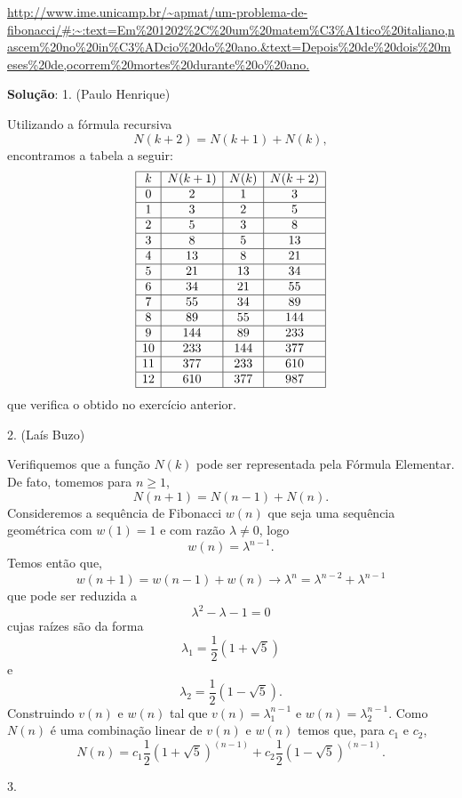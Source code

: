 \url{http://www.ime.unicamp.br/~apmat/um-problema-de-fibonacci/#:~:text=Em%201202%2C%20um%20matem%C3%A1tico%20italiano,nascem%20no%20in%C3%ADcio%20do%20ano.&text=Depois%20de%20dois%20meses%20de,ocorrem%20mortes%20durante%20o%20ano.}

{\color{red}
\textbf{Solução}: 
1. (Paulo Henrique)

Utilizando a fórmula recursiva
\[N(k+2) = N(k+1) + N(k),\]
encontramos a tabela a seguir:
\[\begin{array}{|c|c|c|c|} \hline
k & N(k+1) & N(k) & N(k+2) \\ \hline
0 & 2 & 1 & 3 \\ \hline
1 & 3 & 2 & 5 \\ \hline
2 & 5 & 3 & 8 \\ \hline
3 & 8 & 5 & 13 \\ \hline
4 & 13 & 8 & 21 \\ \hline
5 & 21 & 13 & 34 \\ \hline
6 & 34 & 21 & 55 \\ \hline
7 & 55 & 34 & 89 \\ \hline
8 & 89 & 55 & 144 \\ \hline
9 & 144 & 89 & 233 \\ \hline
10 & 233 & 144 & 377 \\ \hline
11 & 377 & 233 & 610 \\ \hline
12 & 610 & 377 & 987 \\ \hline
\end{array}\]
que verifica o obtido no exercício anterior.

2. (Laís Buzo)

Verifiquemos que a função $N(k)$ pode ser representada pela Fórmula Elementar. De fato, tomemos para $n\geq 1$,
		$$N(n+1)=N(n-1)+N(n).$$
		Consideremos a sequência de Fibonacci $w(n)$ que seja uma sequência geométrica com $w(1)=1$ e com razão $\lambda \neq 0$, logo
		$$w(n)=\lambda^{n-1}.$$
		Temos então que,
		$$w(n+1)=w(n-1)+w(n)\rightarrow\lambda^{n}=\lambda^{n-2}+\lambda^{n-1}$$
		que pode ser reduzida a
		$$\lambda^2-\lambda-1=0$$
		cujas raízes são da forma
		$$\lambda_1=\frac{1}{2}(1+\sqrt{5})$$
		e
		$$\lambda_2=\frac{1}{2}(1-\sqrt{5}).$$
		Construindo $v(n)$ e $w(n)$ tal que $v(n)=\lambda_1^{n-1}$ e $w(n)=\lambda_2^{n-1}$. Como $N(n)$ é uma combinação linear de $v(n)$ e $w(n)$ temos que, para $c_1$ e $c_2$,
		$$N(n)=c_1\frac{1}{2}(1+\sqrt{5})^{(n-1)}+c_2\frac{1}{2}(1-\sqrt{5})^{(n-1)}.$$


3.

}

